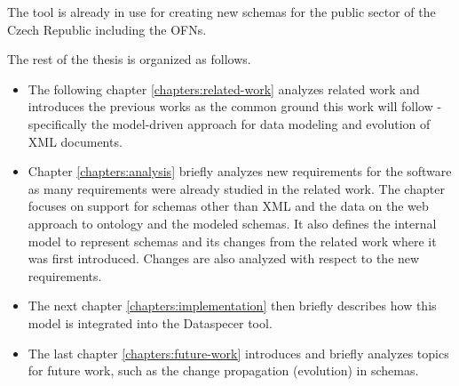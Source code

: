 The tool is already in use for creating new schemas for the public sector of the Czech Republic including the OFNs.

\bigskip

\noindent The rest of the thesis is organized as follows.

\begin{itemize}
    \item The following chapter \ref{chapters:related-work} analyzes related work and introduces the previous works as the common ground this work will follow - specifically the model-driven approach for data modeling and evolution of XML documents.
    \item Chapter \ref{chapters:analysis} briefly analyzes new requirements for the software as many requirements were already studied in the related work. The chapter focuses on support for schemas other than XML and the data on the web \cite{data-on-the-web} approach to ontology and the modeled schemas.
    It also defines the internal model to represent schemas and its changes from the related work where it was first introduced. Changes are also analyzed with respect to the new requirements.
    \item The next chapter \ref{chapters:implementation} then briefly describes how this model is integrated into the Dataspecer tool.
    \item The last chapter \ref{chapters:future-work} introduces and briefly analyzes topics for future work, such as the change propagation (evolution) in schemas.
\end{itemize}

